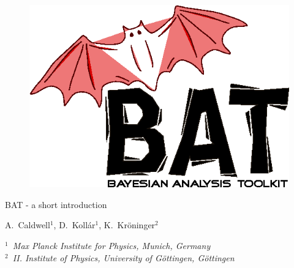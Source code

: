 \documentclass[11pt, a4paper]{article}
\begin{document}

\thispagestyle{empty} 

\begin{figure}
\includegraphics[scale=0.25]{bat.png} 
\end{figure} 

\vspace{1.0cm}

\begin{center}

{\Large {\sc BAT} - a short introduction} 

\vspace{1.0cm}

{A.~Caldwell$^1$, D.~Koll\'ar$^1$, K.~Kr\"oninger$^2$}

\vspace{1.0cm}

{\it $^1$~Max Planck Institute for Physics, Munich, Germany \\ 
$^2$~II. Institute of Physics, University of G\"ottingen, G\"ottingen }
\end{center}

\thispagestyle{empty} 

\pagebreak 


\thispagestyle{empty} 

\tableofcontents

\pagebreak 
\end{document}
